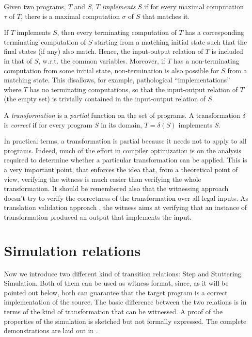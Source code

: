 \begin{fdefinition}[Implementation]
Given two programs, $T$ and $S$, $T$ \emph{implements} $S$ if for every maximal computation $\tau$ of $T$, there is a maximal computation $\sigma$ of $S$ that matches it.
\end{fdefinition}

If $T$ implements $S$, then every terminating computation of $T$ has a corresponding terminating computation of $S$ starting from a matching initial state such that the final states (if any) also match. Hence, the input-output relation of $T$ is included in that of $S$, w.r.t. the common variables. Moreover, if $T$ has a non-terminating computation from some initial state, non-termination is also possible for $S$ from a matching state. This disallows, for example, pathological ``implementations'' where $T$ has no terminating computations, so that the input-output relation of $T$ (the empty set) is trivially contained in the input-output relation of $S$.

\begin{fdefinition}
A \emph{transformation} is a \emph{partial} function on the set of programs. A transformation $\delta$ is \emph{correct} if for every program $S$ in its domain, $T=\delta (S)$ implements $S$.
\end{fdefinition}

In practical terms, a transformation is partial because it needs not to apply to all programs. Indeed, much of the effort in compiler optimization is on the analysis required to determine whether a particular transformation can be applied. This is a very important point, that enforces the idea that, from a theoretical point of view, verifying the witness is much easier than verifying the whole transformation. It should be remembered also that the witnessing approach doesn't try to verify the correctness of the transformation over all legal inputs. As translation validation approach \cite{pnueli1998translation}, the witness aims at verifying that an instance of transformation produced an output that implements the input.

\section{Simulation relations}
\label{sec:stuttering_simulation}

Now we introduce two different kind of transition relations: Step and Stuttering Simulation. Both of them can be used as witness format, since, as it will be pointed out below, both can guarantee that the target program is a correct implementation of the source. The basic difference between the two relations is in terms of the kind of transformation that can be witnessed. A proof of the properties of the simulation is sketched but not formally expressed. The complete demonstrations are laid out in \cite{zucknamjoshi}.

